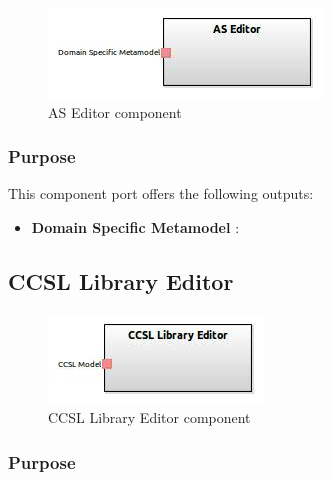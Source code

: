 \documentclass{gemoc} %
\begin{document}
\begin{figure}[htp]
	\begin{center}
	\includegraphics*[trim=0.0cm 0.0cm 0cm 0.0cm, clip=true, scale=1.0]{../images/generated/Generated_AS Editor.jpg}
	\caption{AS Editor component}
	\end{center}
\end{figure}

\subsubsection{Purpose}


This component port offers the following outputs:
\begin{itemize}
  \item \textbf{Domain Specific Metamodel} :
\end{itemize}

\subsection{CCSL Library Editor}

\begin{figure}[htp]
	\begin{center}
	\includegraphics*[trim=0.0cm 0.0cm 0cm 0.0cm, clip=true, scale=1.0]{../images/generated/Generated_CCSL Library Editor.jpg}
	\caption{CCSL Library Editor component}
	\end{center}
\end{figure}

\subsubsection{Purpose}
\end{document}
